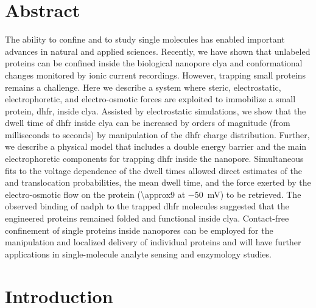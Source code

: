 %
\section{Abstract}
%
\label{sec:trapping:abstract}
%

The ability to confine and to study single molecules has enabled important advances in natural and applied
sciences. Recently, we have shown that unlabeled proteins can be confined inside the biological nanopore
\gls{clya} and conformational changes monitored by ionic current recordings. However, trapping small proteins
remains a challenge. Here we describe a system where steric, electrostatic, electrophoretic, and
electro-osmotic forces are exploited to immobilize a small protein, \gls{dhfr}, inside \gls{clya}. Assisted by
electrostatic simulations, we show that the dwell time of \gls{dhfr} inside \gls{clya} can be increased by
orders of magnitude (from milliseconds to seconds) by manipulation of the \gls{dhfr} charge distribution.
Further, we describe a physical model that includes a double energy barrier and the main electrophoretic
components for trapping \gls{dhfr} inside the nanopore. Simultaneous fits to the voltage dependence of the
dwell times allowed direct estimates of the \cisi{} and \transi{} translocation probabilities, the mean dwell
time, and the force exerted by the electro-osmotic flow on the protein (\SI{\approx9}{\pN} at \SI{-50}{\mV})
to be retrieved. The observed binding of \gls{nadph} to the trapped \gls{dhfr} molecules suggested that the
engineered proteins remained folded and functional inside \gls{clya}. Contact-free confinement of single
proteins inside nanopores can be employed for the manipulation and localized delivery of individual proteins
and will have further applications in single-molecule analyte sensing and enzymology studies.


%
\section{Introduction}
%
\label{sec:trapping:intro}
%

